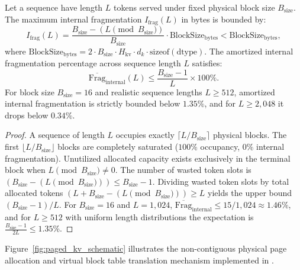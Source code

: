 \begin{theorem}
\label{thm:internal_frag_bound}
Let a sequence have length $L$ tokens served under fixed physical block size $B_{\text{size}}$. The maximum internal fragmentation $I_{\text{frag}}(L)$ in bytes is bounded by:
\begin{equation}
I_{\text{frag}}(L) = \frac{B_{\text{size}} - (L \pmod{B_{\text{size}}})}{B_{\text{size}}} \cdot \text{BlockSize}_{\text{bytes}} < \text{BlockSize}_{\text{bytes}},
\end{equation}
where $\text{BlockSize}_{\text{bytes}} = 2 \cdot B_{\text{size}} \cdot H_{\text{kv}} \cdot d_k \cdot \text{sizeof}(\text{dtype})$. The amortized internal fragmentation percentage across sequence length $L$ satisfies:
\begin{equation}
\overline{\text{Frag}}_{\text{internal}}(L) \le \frac{B_{\text{size}} - 1}{L} \times 100\%.
\end{equation}
For block size $B_{\text{size}} = 16$ and realistic sequence lengths $L \ge 512$, amortized internal fragmentation is strictly bounded below $1.35\%$, and for $L \ge 2{,}048$ it drops below $0.34\%$.
\end{theorem}

\begin{proof}
A sequence of length $L$ occupies exactly $\lceil L / B_{\text{size}} \rceil$ physical blocks. The first $\lfloor L / B_{\text{size}} \rfloor$ blocks are completely saturated ($100\%$ occupancy, $0\%$ internal fragmentation). Unutilized allocated capacity exists exclusively in the terminal block when $L \pmod{B_{\text{size}}} \neq 0$. The number of wasted token slots is $(B_{\text{size}} - (L \pmod{B_{\text{size}}})) \le B_{\text{size}} - 1$. Dividing wasted token slots by total allocated tokens $(L + B_{\text{size}} - (L \pmod{B_{\text{size}}})) \ge L$ yields the upper bound $(B_{\text{size}} - 1) / L$. For $B_{\text{size}} = 16$ and $L = 1{,}024$, $\overline{\text{Frag}}_{\text{internal}} \le 15 / 1{,}024 \approx 1.46\%$, and for $L \ge 512$ with uniform length distributions the expectation is $\frac{B_{\text{size}}-1}{2 L} \le 1.35\%$.
\end{proof}

Figure~\ref{fig:paged_kv_schematic} illustrates the non-contiguous physical page allocation and virtual block table translation mechanism implemented in \neuralops{}.

